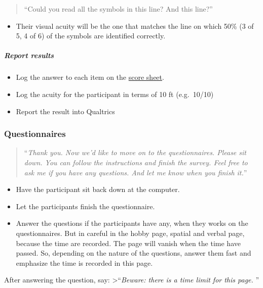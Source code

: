 \documentclass[]{article}
\providecommand{\tightlist}{%
  \setlength{\itemsep}{0pt}\setlength{\parskip}{0pt}}
\let\oldsubparagraph\subparagraph
\renewcommand{\subparagraph}[1]{\oldsubparagraph{#1}\mbox{}}
\begin{document}
\begin{quote}
``Could you read all the symbols in this line? And this line?''
\end{quote}

\begin{itemize}
\tightlist
\item
  Their visual acuity will be the one that matches the line on which
  50\% (3 of 5, 4 of 6) of the symbols are identified correctly.
\end{itemize}

\subparagraph{Report results}\label{report-results}

\begin{itemize}
\tightlist
\item
  Log the answer to each item on the
  \href{vision-screening-score-sheet.html}{score sheet}.
\item
  Log the acuity for the participant in terms of 10 ft (e.g.~10/10)
\item
  Report the result into Qualtrics
\end{itemize}

\subsubsection{Questionnaires}\label{questionnaires}

\begin{quote}
``\emph{Thank you. Now we'd like to move on to the questionnaires.
Please sit down. You can follow the instructions and finish the survey.
Feel free to ask me if you have any questions. And let me know when you
finish it.}''
\end{quote}

\begin{itemize}
\tightlist
\item
  Have the participant sit back down at the computer.
\item
  Let the participants finish the questionnaire.
\item
  Answer the questions if the participants have any, when they works on
  the questionnaires. But in careful in the hobby page, spatial and
  verbal page, because the time are recorded. The page will vanish when
  the time have passed. So, depending on the nature of the questions,
  answer them fast and emphasize the time is recorded in this page.
\end{itemize}

After answering the question, say: \textgreater{}``\emph{Beware: there
is a time limit for this page. }''
\end{document}
